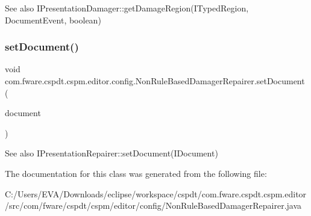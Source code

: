 \begin{DoxySeeAlso}{See also}
I\+Presentation\+Damager\+::get\+Damage\+Region(I\+Typed\+Region, Document\+Event, boolean) 
\end{DoxySeeAlso}
\mbox{\label{classcom_1_1fware_1_1cspdt_1_1cspm_1_1editor_1_1config_1_1_non_rule_based_damager_repairer_ae8015f432b2c8182cc3f981999a0874a}} 
\subsubsection{\texorpdfstring{set\+Document()}{setDocument()}}
{\footnotesize\ttfamily void com.\+fware.\+cspdt.\+cspm.\+editor.\+config.\+Non\+Rule\+Based\+Damager\+Repairer.\+set\+Document (\begin{DoxyParamCaption}\item[{I\+Document}]{document }\end{DoxyParamCaption})\hspace{0.3cm}{\ttfamily [inline]}}

\begin{DoxySeeAlso}{See also}
I\+Presentation\+Repairer\+::set\+Document(\+I\+Document) 
\end{DoxySeeAlso}


The documentation for this class was generated from the following file\+:\begin{DoxyCompactItemize}
\item 
C\+:/\+Users/\+E\+V\+A/\+Downloads/eclipse/workspace/cspdt/com.\+fware.\+cspdt.\+cspm.\+editor/src/com/fware/cspdt/cspm/editor/config/Non\+Rule\+Based\+Damager\+Repairer.\+java\end{DoxyCompactItemize}
